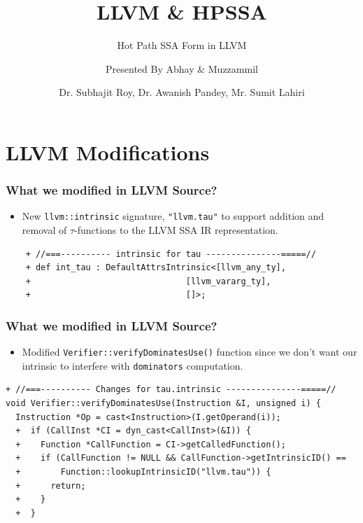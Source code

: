 \documentclass{beamer}
\title[\url{https://google.com}] %
{LLVM \& HPSSA}
\subtitle{Hot Path SSA Form in LLVM}
\author[VIP1 \& VIP2] %
{Presented By Abhay\inst{1} \& Muzzammil\inst{1}}
\institute[IDK] %
{
	\inst{1}%
	IIT Kanpur\\
	PRAISE Group
}
\date[01/03/2022] %
{Dr. Subhajit Roy, Dr. Awanish Pandey, Mr. Sumit Lahiri}
\begin{document}
\frame{\titlepage}
\footnotesize
\section{LLVM Modifications}

\begin{frame}[fragile]
	\frametitle{What we modified in LLVM Source?}
	\begin{itemize}
		\item New \texttt{llvm::intrinsic} signature, \texttt{"llvm.tau"} to support addition and removal of $\tau$-functions to the LLVM SSA IR representation. 
	\end{itemize}
	\begin{verbatim}
	+ //===---------- intrinsic for tau ---------------=====//
	+ def int_tau : DefaultAttrsIntrinsic<[llvm_any_ty],
	+                               [llvm_vararg_ty],
	+                               []>;
	\end{verbatim}
\end{frame}
\footnotesize
\begin{frame}[fragile]
\frametitle{What we modified in LLVM Source?}
\begin{itemize}
	\item Modified \texttt{Verifier::verifyDominatesUse()} function since we don't want our intrinsic to interfere with \texttt{dominators} computation.  
\end{itemize}
\begin{verbatim}
+ //===---------- Changes for tau.intrinsic ---------------=====//
void Verifier::verifyDominatesUse(Instruction &I, unsigned i) {
  Instruction *Op = cast<Instruction>(I.getOperand(i));
  +  if (CallInst *CI = dyn_cast<CallInst>(&I)) {
  +    Function *CallFunction = CI->getCalledFunction();
  +    if (CallFunction != NULL && CallFunction->getIntrinsicID() ==
  +        Function::lookupIntrinsicID("llvm.tau")) {
  +      return;
  +    }
  +  }
	\end{verbatim}
\end{frame}
\end{document}
